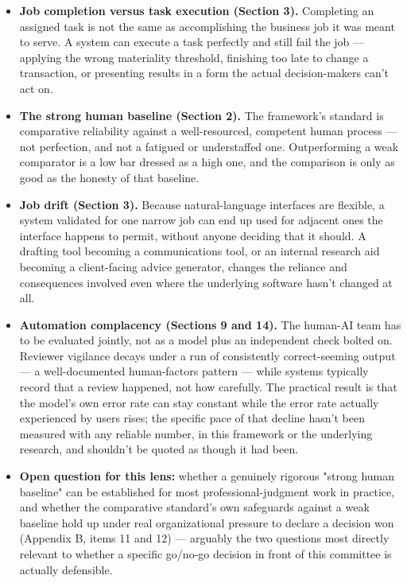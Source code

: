 \begin{itemize}
\item \textbf{Job completion versus task execution (Section 3).} Completing an assigned task is not the same as accomplishing the business job it was meant to serve. A system can execute a task perfectly and still fail the job --- applying the wrong materiality threshold, finishing too late to change a transaction, or presenting results in a form the actual decision-makers can't act on.
\item \textbf{The strong human baseline (Section 2).} The framework's standard is comparative reliability against a well-resourced, competent human process --- not perfection, and not a fatigued or understaffed one. Outperforming a weak comparator is a low bar dressed as a high one, and the comparison is only as good as the honesty of that baseline.
\item \textbf{Job drift (Section 3).} Because natural-language interfaces are flexible, a system validated for one narrow job can end up used for adjacent ones the interface happens to permit, without anyone deciding that it should. A drafting tool becoming a communications tool, or an internal research aid becoming a client-facing advice generator, changes the reliance and consequences involved even where the underlying software hasn't changed at all.
\item \textbf{Automation complacency (Sections 9 and 14).} The human-AI team has to be evaluated jointly, not as a model plus an independent check bolted on. Reviewer vigilance decays under a run of consistently correct-seeming output --- a well-documented human-factors pattern --- while systems typically record that a review happened, not how carefully. The practical result is that the model's own error rate can stay constant while the error rate actually experienced by users rises; the specific pace of that decline hasn't been measured with any reliable number, in this framework or the underlying research, and shouldn't be quoted as though it had been.
\item \textbf{Open question for this lens:} whether a genuinely rigorous "strong human baseline" can be established for most professional-judgment work in practice, and whether the comparative standard's own safeguards against a weak baseline hold up under real organizational pressure to declare a decision won (Appendix B, items 11 and 12) --- arguably the two questions most directly relevant to whether a specific go/no-go decision in front of this committee is actually defensible.
\end{itemize}
